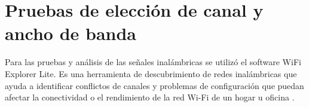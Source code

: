 






\vspace{1.0cm}
\section{Pruebas de elección de canal y ancho de banda}
Para las pruebas y análisis de las señales inalámbricas se utilizó el software WiFi Explorer Lite. Es una herramienta de descubrimiento de redes inalámbricas que ayuda a identificar conflictos de canales y problemas de configuración que puedan afectar la conectividad o el rendimiento de la red Wi-Fi de un hogar u oficina \citep{WEBSITE:24}. 


